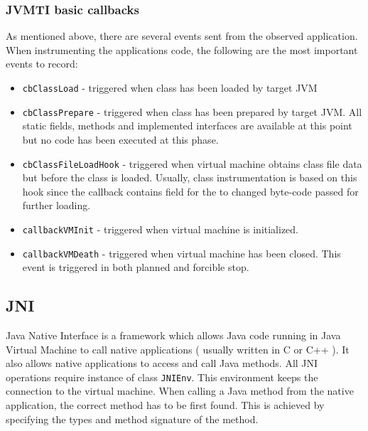 \subsubsection{JVMTI basic callbacks}
As mentioned above, there are several events sent from the observed application. When instrumenting the applications code, the following are the most important events to record:
\begin{itemize}
	\item \texttt{cbClassLoad} - triggered when class has been loaded by target JVM
	\item \texttt{cbClassPrepare} - triggered when class has been prepared by target JVM. All static fields, methods and implemented interfaces are available at this point but no code has been executed at this phase.
	\item \texttt{cbClassFileLoadHook} - triggered when virtual machine obtains class file data but before the class is loaded. Usually, class instrumentation is based on this hook since the callback contains field for the to changed byte-code passed for further loading.
	\item  \texttt{callbackVMInit} - triggered when virtual machine is initialized.
	\item  \texttt{callbackVMDeath} - triggered when virtual machine has been closed. This event is triggered in both planned and forcible stop.
\end{itemize}

\subsection{JNI}
\label{JNI}
Java Native Interface is a framework which allows Java code running in Java Virtual Machine to call native applications ( usually written in C or C++ ). It also allows native applications to access and call Java methods. All JNI operations require instance of class \texttt{JNIEnv}. This environment keeps the connection to the virtual machine. When calling a Java method from the native application, the correct method has to be first found. This is achieved by specifying  the types and method signature of the method.
